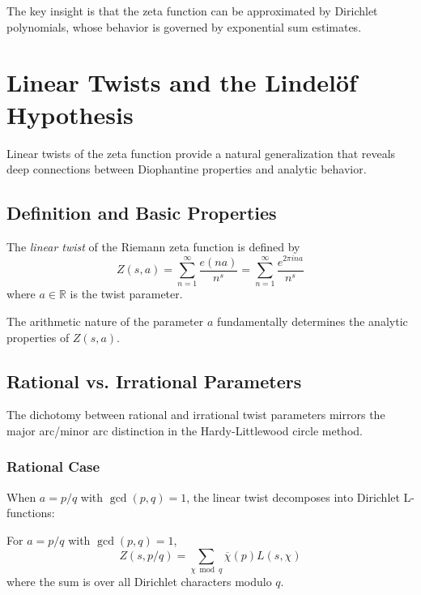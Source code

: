 The key insight is that the zeta function can be approximated by Dirichlet polynomials, whose behavior is governed by exponential sum estimates.

\section{Linear Twists and the Lindelöf Hypothesis}
\label{sec:linear_twists}

Linear twists of the zeta function provide a natural generalization that reveals deep connections between Diophantine properties and analytic behavior.

\subsection{Definition and Basic Properties}

\begin{definition}
The \emph{linear twist} of the Riemann zeta function is defined by
\begin{equation}
Z(s,a) = \sum_{n=1}^{\infty} \frac{e(na)}{n^s} = \sum_{n=1}^{\infty} \frac{e^{2\pi i na}}{n^s}
\end{equation}
where $a \in \mathbb{R}$ is the twist parameter.
\end{definition}

The arithmetic nature of the parameter $a$ fundamentally determines the analytic properties of $Z(s,a)$.

\subsection{Rational vs. Irrational Parameters}

The dichotomy between rational and irrational twist parameters mirrors the major arc/minor arc distinction in the Hardy-Littlewood circle method.

\subsubsection{Rational Case}

When $a = p/q$ with $\gcd(p,q) = 1$, the linear twist decomposes into Dirichlet L-functions:

\begin{proposition}
For $a = p/q$ with $\gcd(p,q) = 1$,
\begin{equation}
Z(s, p/q) = \sum_{\chi \bmod q} \overline{\chi}(p) L(s, \chi)
\end{equation}
where the sum is over all Dirichlet characters modulo $q$.
\end{proposition}

